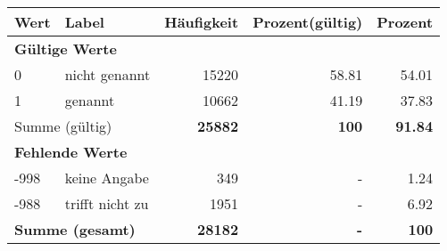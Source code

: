      \begin{longtable}{lXrrr}
     \toprule
     \textbf{Wert} & \textbf{Label} & \textbf{Häufigkeit} & \textbf{Prozent(gültig)} & \textbf{Prozent} \\
     \endhead
     \midrule
     \multicolumn{5}{l}{\textbf{Gültige Werte}}\\

     0 &
     \multicolumn{1}{X}{ nicht genannt   } &


       \num{15220} &
       \num[round-mode=places,round-precision=2]{58,81} &
         \num[round-mode=places,round-precision=2]{54,01} \\

     1 &
     \multicolumn{1}{X}{ genannt   } &


       \num{10662} &
       \num[round-mode=places,round-precision=2]{41,19} &
         \num[round-mode=places,round-precision=2]{37,83} \\
     \midrule
     \multicolumn{2}{l}{Summe (gültig)} &
       \textbf{\num{25882}} &
     \textbf{100} &
       \textbf{\num[round-mode=places,round-precision=2]{91,84}} \\
     \multicolumn{5}{l}{\textbf{Fehlende Werte}}\\
       -998 &
       keine Angabe &
         \num{349} &
        - &
         \num[round-mode=places,round-precision=2]{1,24} \\
       -988 &
       trifft nicht zu &
         \num{1951} &
        - &
         \num[round-mode=places,round-precision=2]{6,92} \\
     \midrule
     \multicolumn{2}{l}{\textbf{Summe (gesamt)}} &
          \textbf{\num{28182}} &
        \textbf{-} &
        \textbf{100} \\
     \bottomrule
     \end{longtable}
     
